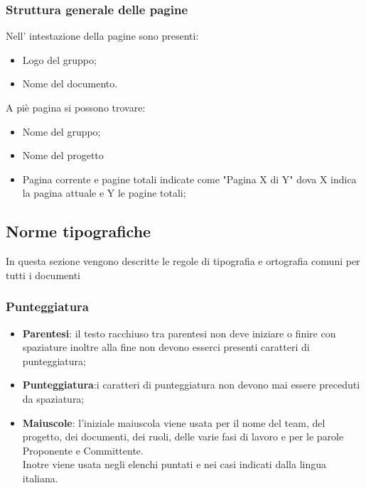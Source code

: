 \documentclass[../NormeDiProgetto.tex]{subfiles}
\begin{document}
		\subsubsection{Struttura generale delle pagine}
		Nell' intestazione della pagine sono presenti:
		\begin{itemize}
			\item Logo del gruppo;
			\item Nome del documento.
		\end{itemize}A piè pagina si possono trovare:    
		\begin{itemize}
			\item Nome del gruppo;
			\item Nome del progetto    
			\item Pagina corrente e pagine totali indicate come "Pagina X di Y" dova X indica la pagina attuale e Y le pagine totali;
		\end{itemize} 
		\subsection{Norme tipografiche}
		In questa sezione vengono descritte le regole di tipografia e ortografia comuni per tutti i documenti 
		\subsubsection{Punteggiatura}
		\begin{itemize}
			\item \textbf{Parentesi}: il testo racchiuso tra parentesi non deve iniziare o finire con spaziature inoltre alla fine non devono esserci presenti caratteri di punteggiatura;
			\item \textbf{Punteggiatura}:i caratteri di punteggiatura non devono mai essere preceduti da spaziatura;
			\item \textbf{Maiuscole}: l'iniziale maiuscola viene usata per il nome del team, del progetto, dei documenti, dei ruoli, delle varie fasi di lavoro e per le parole Proponente e Committente. \\Inotre viene usata negli elenchi puntati e nei casi indicati dalla lingua italiana.
		\end{itemize}
		
\end{document}
